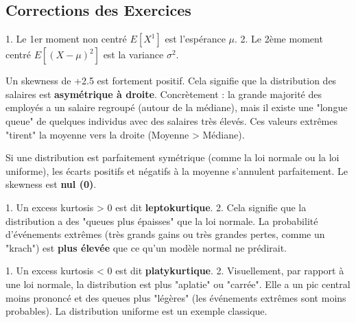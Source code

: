 
\subsection{Corrections des Exercices}

\begin{correctionbox}
1.  Le 1er moment non centré $E[X^1]$ est l'espérance $\mu$.
2.  Le 2ème moment centré $E[(X-\mu)^2]$ est la variance $\sigma^2$.
\end{correctionbox}

\begin{correctionbox}
Un skewness de +2.5 est fortement positif. Cela signifie que la distribution des salaires est \textbf{asymétrique à droite}.
Concrètement : la grande majorité des employés a un salaire regroupé (autour de la médiane), mais il existe une "longue queue" de quelques individus avec des salaires très élevés. Ces valeurs extrêmes "tirent" la moyenne vers la droite (Moyenne > Médiane).
\end{correctionbox}

\begin{correctionbox}
Si une distribution est parfaitement symétrique (comme la loi normale ou la loi uniforme), les écarts positifs et négatifs à la moyenne s'annulent parfaitement. Le skewness est \textbf{nul (0)}.
\end{correctionbox}

\begin{correctionbox}
1.  Un excess kurtosis > 0 est dit \textbf{leptokurtique}.
2.  Cela signifie que la distribution a des "queues plus épaisses" que la loi normale. La probabilité d'événements extrêmes (très grands gains ou très grandes pertes, comme un "krach") est \textbf{plus élevée} que ce qu'un modèle normal ne prédirait.
\end{correctionbox}

\begin{correctionbox}
1.  Un excess kurtosis < 0 est dit \textbf{platykurtique}.
2.  Visuellement, par rapport à une loi normale, la distribution est plus "aplatie" ou "carrée". Elle a un pic central moins prononcé et des queues plus "légères" (les événements extrêmes sont moins probables). La distribution uniforme est un exemple classique.
\end{correctionbox}

